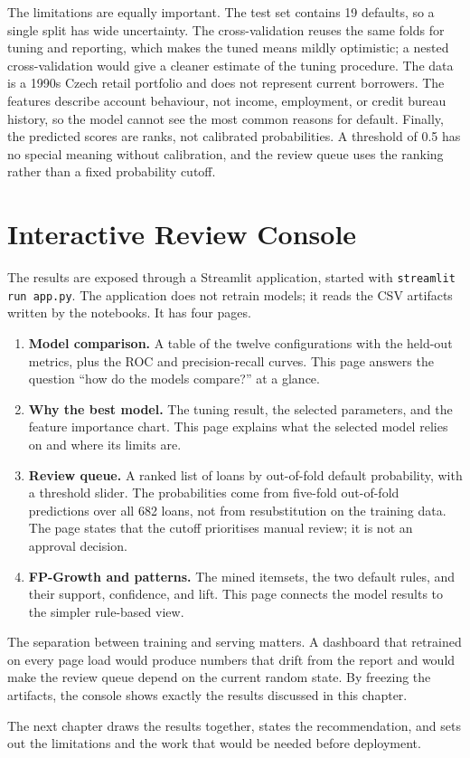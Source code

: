 The limitations are equally important. The test set contains 19 defaults, so a single split has wide uncertainty. The cross-validation reuses the same folds for tuning and reporting, which makes the tuned means mildly optimistic; a nested cross-validation would give a cleaner estimate of the tuning procedure. The data is a 1990s Czech retail portfolio and does not represent current borrowers. The features describe account behaviour, not income, employment, or credit bureau history, so the model cannot see the most common reasons for default. Finally, the predicted scores are ranks, not calibrated probabilities. A threshold of 0.5 has no special meaning without calibration, and the review queue uses the ranking rather than a fixed probability cutoff.

\section{Interactive Review Console}
\label{sec:streamlit}

The results are exposed through a Streamlit application, started with \texttt{streamlit run app.py}. The application does not retrain models; it reads the CSV artifacts written by the notebooks. It has four pages.

\begin{enumerate}
    \item \textbf{Model comparison.} A table of the twelve configurations with the held-out metrics, plus the ROC and precision-recall curves. This page answers the question ``how do the models compare?'' at a glance.
    \item \textbf{Why the best model.} The tuning result, the selected parameters, and the feature importance chart. This page explains what the selected model relies on and where its limits are.
    \item \textbf{Review queue.} A ranked list of loans by out-of-fold default probability, with a threshold slider. The probabilities come from five-fold out-of-fold predictions over all 682 loans, not from resubstitution on the training data. The page states that the cutoff prioritises manual review; it is not an approval decision.
    \item \textbf{FP-Growth and patterns.} The mined itemsets, the two default rules, and their support, confidence, and lift. This page connects the model results to the simpler rule-based view.
\end{enumerate}

The separation between training and serving matters. A dashboard that retrained on every page load would produce numbers that drift from the report and would make the review queue depend on the current random state. By freezing the artifacts, the console shows exactly the results discussed in this chapter.

The next chapter draws the results together, states the recommendation, and sets out the limitations and the work that would be needed before deployment.
